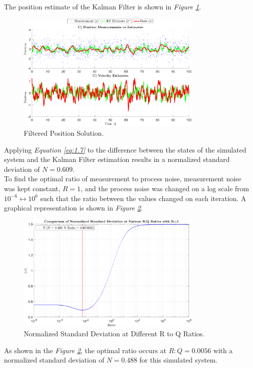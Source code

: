 \documentclass[10pt]{article}
\begin{document}
\begin{enumerate}[label=\textbf{\arabic*.}]
  The position estimate of the Kalman Filter is shown in \emph{Figure \ref{f:1.3}}.
  \begin{figure}[H]
    \centering
    \includegraphics[width=0.8\textwidth]{p1_c2.png}
    \caption{Filtered Position Solution.}
    \label{f:1.3}
  \end{figure}
  Applying \emph{Equation \ref{eq:1.7}} to the difference between the states of 
  the simulated system and the Kalman Filter estimation results in a normalized 
  standard deviation of $N=0.609$. \\

  To find the optimal ratio of measurement to process noise, measurement noise 
  was kept constant, $R=1$, and the process noise was changed on a log scale from 
  $10^{-6} \leftrightarrow 10^{6}$ such that the ratio between the values changed on each 
  iteration. A graphical representation is shown in \emph{Figure \ref{f:1.4}}.
  \begin{figure}[H]
    \centering
    \includegraphics[width=0.8\textwidth]{p1_e.png}
    \caption{Normalized Standard Deviation at Different R to Q Ratios.}
    \label{f:1.4}
  \end{figure}
  As shown in the \emph{Figure \ref{f:1.4}}, the optimal ratio occurs at 
  $R:Q=0.0056$ with a normalized standard deviation of $N=0.488$ for this 
  simulated system.


\end{enumerate}
\end{document}
